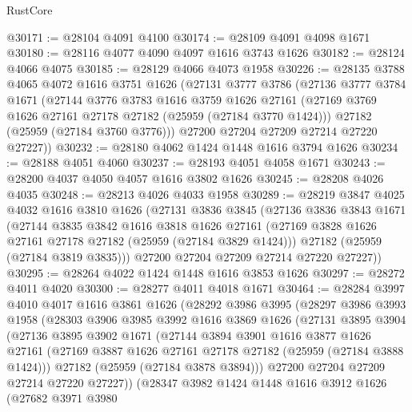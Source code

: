 \begin{lexlean}{RustCore}
\begin{coremodule}
@30171 := @28104 @4091 @4100
@30174 := @28109 @4091 @4098 @1671
@30180 := @28116 @4077 @4090 @4097 @1616 @3743 @1626
@30182 := @28124 @4066 @4075
@30185 := @28129 @4066 @4073 @1958
@30226 := @28135
    @3788
    @4065
    @4072
    @1616
    @3751
    @1626
    (@27131
      @3777
      @3786
      (@27136
        @3777
        @3784
        @1671
        (@27144
          @3776
          @3783
          @1616
          @3759
          @1626
          @27161
          (@27169 @3769 @1626 @27161 @27178 @27182 (@25959 (@27184 @3770 @1424)))
          @27182
          (@25959 (@27184 @3760 @3776)))
        @27200
        @27204
        @27209
        @27214
        @27220
        @27227))
@30232 := @28180 @4062 @1424 @1448 @1616 @3794 @1626
@30234 := @28188 @4051 @4060
@30237 := @28193 @4051 @4058 @1671
@30243 := @28200 @4037 @4050 @4057 @1616 @3802 @1626
@30245 := @28208 @4026 @4035
@30248 := @28213 @4026 @4033 @1958
@30289 := @28219
    @3847
    @4025
    @4032
    @1616
    @3810
    @1626
    (@27131
      @3836
      @3845
      (@27136
        @3836
        @3843
        @1671
        (@27144
          @3835
          @3842
          @1616
          @3818
          @1626
          @27161
          (@27169 @3828 @1626 @27161 @27178 @27182 (@25959 (@27184 @3829 @1424)))
          @27182
          (@25959 (@27184 @3819 @3835)))
        @27200
        @27204
        @27209
        @27214
        @27220
        @27227))
@30295 := @28264 @4022 @1424 @1448 @1616 @3853 @1626
@30297 := @28272 @4011 @4020
@30300 := @28277 @4011 @4018 @1671
@30464 := @28284
    @3997
    @4010
    @4017
    @1616
    @3861
    @1626
    (@28292
      @3986
      @3995
      (@28297
        @3986
        @3993
        @1958
        (@28303
          @3906
          @3985
          @3992
          @1616
          @3869
          @1626
          (@27131
            @3895
            @3904
            (@27136
              @3895
              @3902
              @1671
              (@27144
                @3894
                @3901
                @1616
                @3877
                @1626
                @27161
                (@27169 @3887 @1626 @27161 @27178 @27182 (@25959 (@27184 @3888 @1424)))
                @27182
                (@25959 (@27184 @3878 @3894)))
              @27200
              @27204
              @27209
              @27214
              @27220
              @27227))
          (@28347
            @3982
            @1424
            @1448
            @1616
            @3912
            @1626
            (@27682
              @3971
              @3980

\end{coremodule}
\end{lexlean}

